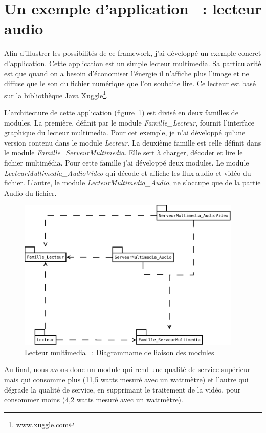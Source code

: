 \documentclass[a4paper, 11pt]{report}
\begin{document}
	\section{Un exemple d'application ~: lecteur audio}
Afin d'illustrer les possibilités de ce framework, j'ai développé un exemple concret d'application. Cette application est un simple lecteur multimedia. Sa particularité est que quand on a besoin d'économiser l'énergie il n'affiche plus l'image et ne diffuse que le son du fichier numérique que l'on souhaite lire. Ce lecteur est basé sur la bibliothèque Java Xuggle\footnote{\href{http://www.xuggle.com/}{www.xuggle.com}}.

L'architecture de cette application (figure~\ref{lecMult}) est divisé en deux familles de modules. La première, définit par le module \textit{Famille\_Lecteur}, fournit l'interface graphique du lecteur multimedia. Pour cet exemple, je n'ai développé qu'une version contenu dans le module \textit{Lecteur}. La deuxième famille est celle définit dans le module \textit{Famille\_ServeurMultimedia}. Elle sert à charger, décoder et lire le fichier multimédia. Pour cette famille j'ai développé deux modules. Le module \textit{LecteurMultimedia\_AudioVideo} qui décode et affiche les flux audio et vidéo du fichier. L'autre, le module \textit{LecteurMultimedia\_Audio}, ne s'occupe que de la partie Audio du fichier.

\begin{figure}
	\centering
	\includegraphics[width=0.95\textwidth]{figures/EcoPattern_LecteurMultimedia}
	\caption{Lecteur multimedia ~: Diagrammame de liaison des modules}
	\label{lecMult}
\end{figure}

Au final, nous avons donc un module qui rend une qualité de service supérieur mais qui consomme plus (11,5 watts mesuré avec un wattmètre) et l'autre qui dégrade la qualité de service, en supprimant le traitement de la vidéo, pour consommer moins (4,2 watts mesuré avec un wattmètre).
\end{document}
